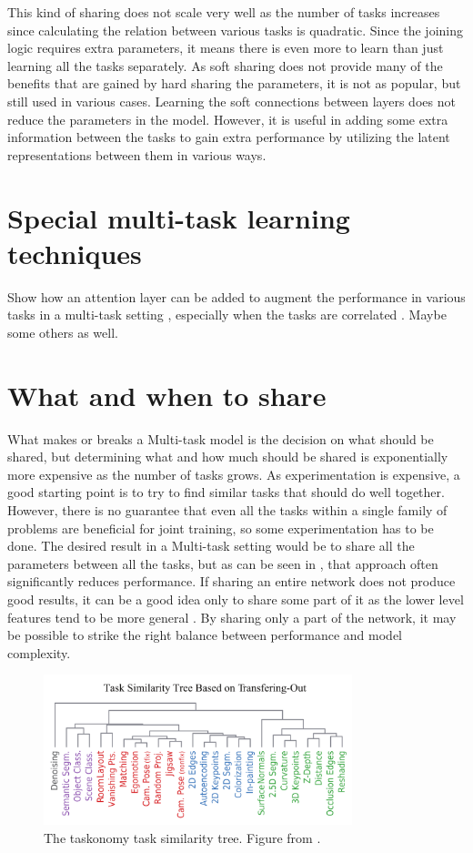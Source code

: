 This kind of sharing does not scale very well as the number of tasks increases since calculating the relation between various tasks is quadratic.
Since the joining logic requires extra parameters, it means there is even more to learn than just learning all the tasks separately.
As soft sharing does not provide many of the benefits that are gained by hard sharing the parameters, it is not as popular, but still used in various cases.
Learning the soft connections between layers does not reduce the parameters in the model.
However, it is useful in adding some extra information between the tasks to gain extra performance by utilizing the latent representations between them in various ways.

\section{Special multi-task learning techniques}
Show how an attention layer can be added to augment the performance in various tasks in a multi-task setting \citep{multiTaskAttention}, especially when the tasks are correlated \citep{multiTaskWeather} \citep{weatherNet}. Maybe some others as well.

\section{What and when to share}
What makes or breaks a Multi-task model is the decision on what should be shared, but determining what and how much should be shared is exponentially more expensive as the number of tasks grows.
As experimentation is expensive, a good starting point is to try to find similar tasks that should do well together.
However, there is no guarantee that even all the tasks within a single family of problems are beneficial for joint training, so some experimentation has to be done.
The desired result in a Multi-task setting would be to share all the parameters between all the tasks, but as can be seen in \citep{uberNet}, that approach often significantly reduces performance.
If sharing an entire network does not produce good results, it can be a good idea only to share some part of it as the lower level features tend to be more general \citep{transferringMidLevelRepresentations}.
By sharing only a part of the network, it may be possible to strike the right balance between performance and model complexity.

\begin{figure}[h!]
    \centering
    \includegraphics[width=0.8\textwidth]{imgs/taskonomy.png}
    \caption{The taskonomy task similarity tree. Figure from \citep{taskonomy}.\label{fig:params}}
\end{figure}

